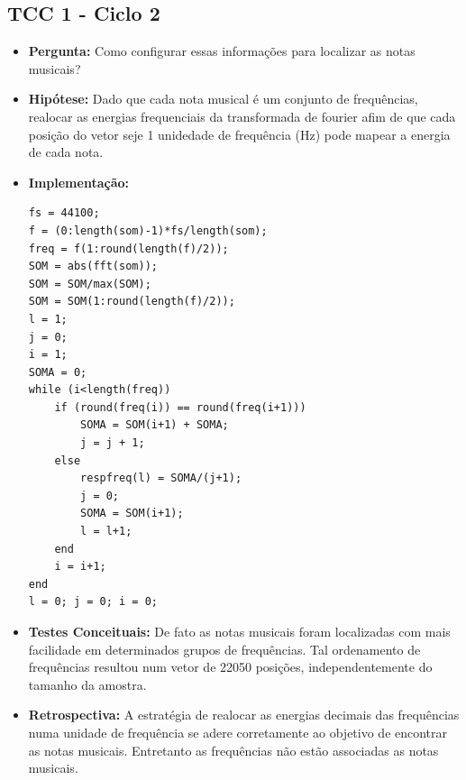 \subsection{TCC 1 - Ciclo 2}
\begin{itemize}
\item \textbf{Pergunta:} Como configurar essas informações para localizar as notas musicais?
\item \textbf{Hipótese:} Dado que cada nota musical é um conjunto de frequências, realocar as energias frequenciais da transformada de fourier afim de que cada posição do vetor seje 1 unidedade de frequência (Hz) pode mapear a energia de cada nota.
\item \textbf{Implementação:} 
\begin{lstlisting}
fs = 44100;
f = (0:length(som)-1)*fs/length(som);
freq = f(1:round(length(f)/2));
SOM = abs(fft(som));
SOM = SOM/max(SOM);
SOM = SOM(1:round(length(f)/2));
l = 1;
j = 0;
i = 1;
SOMA = 0; 
while (i<length(freq))
    if (round(freq(i)) == round(freq(i+1)))
        SOMA = SOM(i+1) + SOMA;
        j = j + 1;
    else
        respfreq(l) = SOMA/(j+1);
        j = 0;
        SOMA = SOM(i+1);
        l = l+1;
    end
    i = i+1;
end
l = 0; j = 0; i = 0;
\end{lstlisting}
\item \textbf{Testes Conceituais:} De fato as notas musicais foram localizadas com mais facilidade em determinados grupos de frequências. Tal ordenamento de frequências resultou num vetor de 22050 posições, independentemente do tamanho da amostra.
\item \textbf{Retrospectiva:} A estratégia de realocar as energias decimais das frequências numa unidade de frequência se adere corretamente ao objetivo de encontrar as notas musicais. Entretanto as frequências não estão associadas as notas musicais.
\end{itemize}

